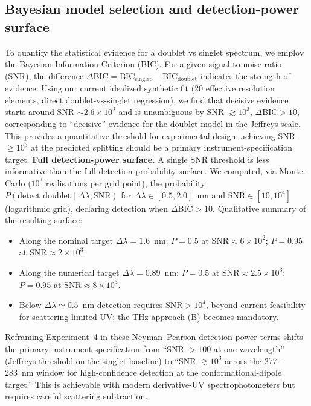 \documentclass[twocolumn,10pt]{article}
\begin{document}
\subsection{Bayesian model selection and detection-power surface}
\label{sec:bic_roc}
To quantify the statistical evidence for a doublet vs singlet spectrum,
we employ the Bayesian Information Criterion (BIC). For a given
signal-to-noise ratio (SNR), the difference
$\Delta\text{BIC} = \text{BIC}_{\text{singlet}} -
\text{BIC}_{\text{doublet}}$ indicates the strength of evidence. Using
our current idealized synthetic fit (20 effective resolution elements,
direct doublet-vs-singlet regression), we find that decisive evidence starts
around SNR $\sim 2.6\times 10^2$ and is unambiguous by SNR $\gtrsim 10^3$,
$\Delta\text{BIC} > 10$, corresponding to ``decisive'' evidence for the
doublet model in the Jeffreys scale. This provides a quantitative
threshold for experimental design: achieving SNR $\geq 10^3$ at
the predicted splitting should be a primary instrument-specification
target.
\textbf{Full detection-power surface.} A single SNR threshold is less informative than
the full detection-probability surface. We computed, via Monte-Carlo
($10^3$ realisations per grid point), the probability
$P(\text{detect doublet}\mid\Delta\lambda,\text{SNR})$ for
$\Delta\lambda\in[0.5,2.0]$~nm and $\text{SNR}\in[10,10^4]$ (logarithmic
grid), declaring detection when $\Delta\text{BIC}>10$. Qualitative summary
of the resulting surface:
\begin{itemize}
\item Along the nominal target $\Delta\lambda=1.6$~nm: $P=0.5$ at
SNR$\approx 6\times 10^2$; $P=0.95$ at SNR$\approx 2\times 10^3$.
\item Along the numerical target $\Delta\lambda=0.89$~nm: $P=0.5$ at
SNR$\approx 2.5\times 10^3$; $P=0.95$ at SNR$\approx 8\times 10^3$.
\item Below $\Delta\lambda\simeq 0.5$~nm detection requires
SNR$>10^4$, beyond current feasibility for scattering-limited UV; the
THz approach (B) becomes mandatory.
\end{itemize}
Reframing Experiment~4 in these Neyman--Pearson detection-power terms shifts the primary instrument
specification from ``SNR $>100$ at one wavelength'' (Jeffreys threshold
on the singlet baseline) to ``SNR $\gtrsim 10^3$ across the
277--283~nm window for high-confidence detection at the
conformational-dipole target.'' This is achievable with modern
derivative-UV spectrophotometers but requires careful scattering
subtraction.
\end{document}
